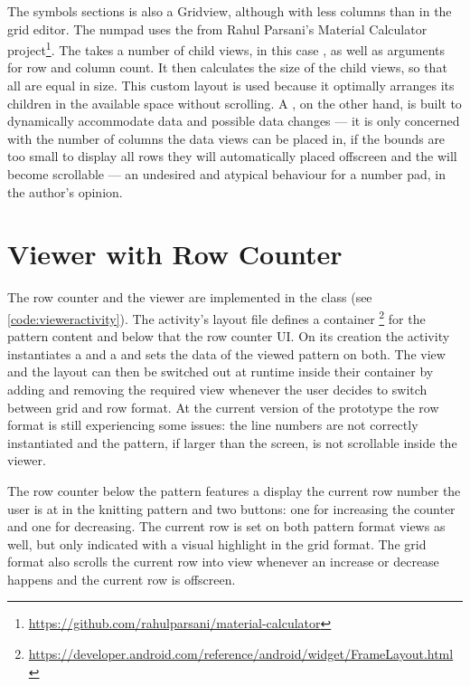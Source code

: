 The symbols sections is also a Gridview, although with less columns than in the grid editor. The numpad uses the  from Rahul Parsani's Material Calculator project\footnote{\url{https://github.com/rahulparsani/material-calculator}}. The  takes a number of child views, in this case , as well as arguments for row and column count. It then calculates the size of the child views, so that all are equal in size. This custom layout is used because it optimally arranges its children in the available space without scrolling. A , on the other hand, is built to dynamically accommodate data and possible data changes --- it is only concerned with the number of columns the data views can be placed in, if the  bounds are too small to display all rows they will automatically placed offscreen and the  will become scrollable --- an undesired and atypical behaviour for a number pad, in the author's opinion.

\section{Viewer with Row Counter}
The row counter and the viewer are implemented in the  class (see \ref{code:vieweractivity}). The activity's layout file defines a container \footnote{\url{https://developer.android.com/reference/android/widget/FrameLayout.html}} for the pattern content and below that the row counter \gls{UI}. On its creation the activity instantiates a  and a  and sets the data of the viewed pattern on both. The view and the layout can then be switched out at runtime inside their container by adding and removing the required view whenever the user decides to switch between grid and row format.
At the current version of the prototype the row format is still experiencing some issues: the line numbers are not correctly instantiated and the pattern, if larger than the screen, is not scrollable inside the viewer.

The row counter below the pattern features a display the current row number the user is at in the knitting pattern and two buttons: one for increasing the counter and one for decreasing. The current row is set on both pattern format views as well, but only indicated with a visual highlight in the grid format. The grid format also scrolls the current row into view whenever an increase or decrease happens and the current row is offscreen. 

